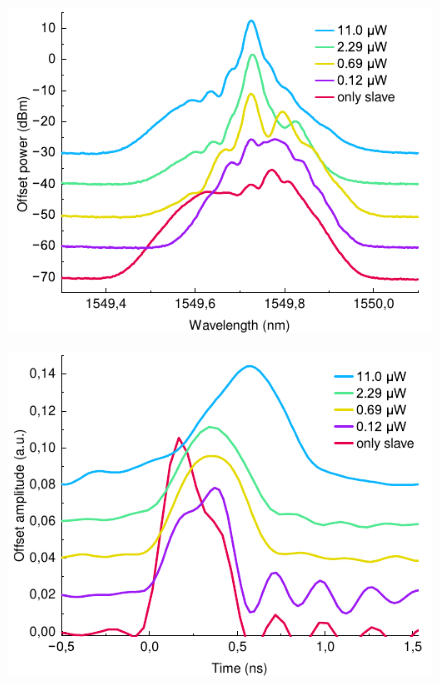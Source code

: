 \begin{figure}
	\centering
	\includegraphics[width=\textwidth]{images/spectra_att.pdf}
	\caption{}
\end{figure}

\begin{figure}
	\centering
	\includegraphics[width=\textwidth]{images/envelope_att.pdf}
	\caption{}
\end{figure}
\label{fig:QKD_att}

